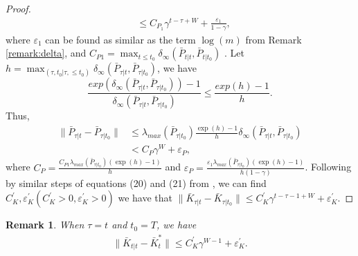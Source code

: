 \documentclass[letterpaper, 10 pt, conference]{ieeeconf}  %
\newtheorem{remark}{Remark}
\begin{document}
\begin{proof}
\begin{align*}
        &\leq C_{P_{1}}\gamma^{t-\tau+W}+\frac{\varepsilon_{1}}{1-\gamma},
    \end{align*}
    where $\varepsilon_{1}$ can be found as similar as the term $\log(m)$ from Remark \ref{remark:delta}, and $C_{P1} = \max_{t\leq t_{0}} \delta_{\infty}(\bar{P}_{t|t},\bar{P}_{t|t_{0}})$ . 
Let $h = \max_{(\tau,t_{0}| \tau,\leq t_{0})} \delta_{\infty}(\bar{P}_{\tau|t},\bar{P}_{\tau|t_{0}})$, we have
    \begin{equation*}
        \frac{exp(\delta_{\infty}(\bar{P}_{\tau|t},\bar{P}_{\tau|t_{0}}))-1}{\delta_{\infty}(\bar{P}_{\tau|t},\bar{P}_{\tau|t_{0}})} \leq \frac{exp(h)-1}{h}.
    \end{equation*}
    Thus,
    \begin{align*}
        \|\bar{P}_{\tau|t}-\bar{P}_{\tau|t_{0}}\| &\leq \lambda_{max}(\bar{P}_{\tau|t_{0}})\frac{\exp(h)-1}{h}\delta_{\infty}(\bar{P}_{\tau|t},\bar{P}_{\tau|t_{0}})\\
        &< C_{P}\gamma^{W}+\varepsilon_{P},
    \end{align*}
    where $C_{P} = \frac{C_{P1}\lambda_{max}(\bar{P}_{\tau|t_{0}})(\exp(h)-1)}{h}$ and $\varepsilon_{P} = \frac{\varepsilon_{1}\lambda_{max}(\bar{P}_{\tau|t_{0}})(\exp(h)-1)}{h(1-\gamma)}$. Following by similar steps of equations (20) and (21) from \cite[Lemma 8]{chen_regret_2023}, we can find $C_{K}^{'},\varepsilon_{K}^{'}(C_{K}^{'}>0,\varepsilon_{K}^{'}>0)$ we have that $\|\bar{K}_{\tau|t}-\bar{K}_{\tau|t_{0}}\| \leq C_{K}^{'}\gamma^{t-\tau-1+W}+\varepsilon_{K}^{'}$.
\end{proof}

\begin{remark}
    When $\tau = t$ and $t_{0} = T$, we have
    \begin{align*}
        \|\bar{K}_{t|t}-\bar{K}_{t}^{*}\| \leq C_{K}^{'}\gamma^{W-1} + \varepsilon_{K}^{'}.
    \end{align*}
\end{remark}
\end{document}
